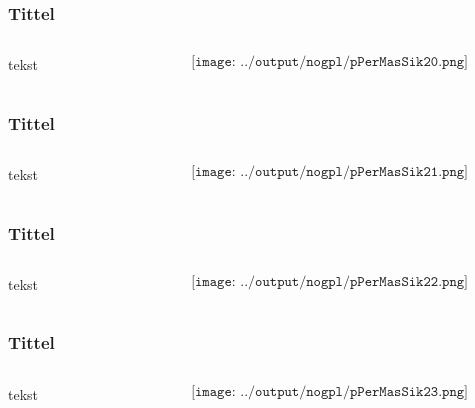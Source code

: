 \documentclass[aspectratio=169,xcolor=dvipsnames]{beamer}
\begin{document}
\begin{frame}
	\frametitle{Tittel}
	\begin{columns}
		\begin{column}{0.5\textwidth}
tekst
			
		\end{column}

		\begin{column}{0.5\textwidth}
	$$\texttt{[image: ../output/nogpl/pPerMasSik20.png]}$$
		\end{column}
	\end{columns}
\end{frame}

\begin{frame}
	\frametitle{Tittel}
	\begin{columns}
		\begin{column}{0.5\textwidth}
tekst
			
		\end{column}

		\begin{column}{0.5\textwidth}
	$$\texttt{[image: ../output/nogpl/pPerMasSik21.png]}$$
		\end{column}
	\end{columns}
\end{frame}

\begin{frame}
	\frametitle{Tittel}
	\begin{columns}
		\begin{column}{0.5\textwidth}
tekst
			
		\end{column}

		\begin{column}{0.5\textwidth}
	$$\texttt{[image: ../output/nogpl/pPerMasSik22.png]}$$
		\end{column}
	\end{columns}
\end{frame}

\begin{frame}
	\frametitle{Tittel}
	\begin{columns}
		\begin{column}{0.5\textwidth}
tekst
			
		\end{column}

		\begin{column}{0.5\textwidth}
	$$\texttt{[image: ../output/nogpl/pPerMasSik23.png]}$$
		\end{column}
	\end{columns}
\end{frame}
\end{document}
